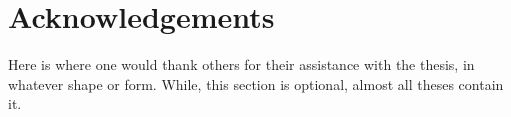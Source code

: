 \chapter{Acknowledgements}

Here is where one would thank others for their assistance with the thesis, 
in whatever shape or form. While, this section is optional, almost all theses
contain it.